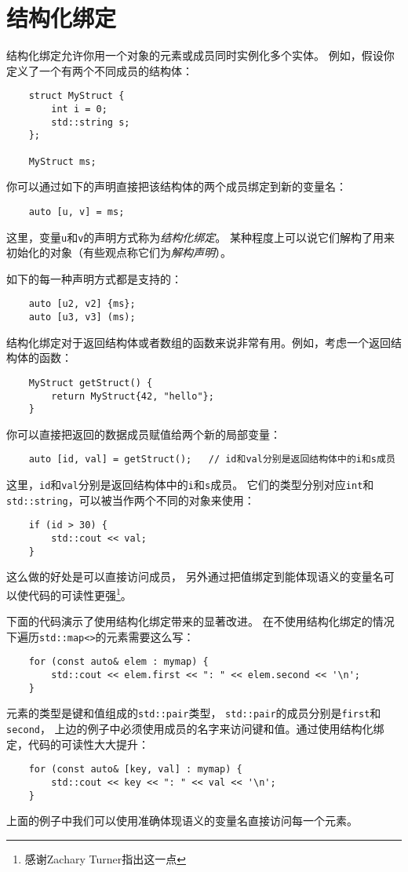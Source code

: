 \section{结构化绑定}\label{ch1}
结构化绑定允许你用一个对象的元素或成员同时实例化多个实体。
例如，假设你定义了一个有两个不同成员的结构体：
\begin{lstlisting}
    struct MyStruct {
        int i = 0;
        std::string s;
    };

    MyStruct ms;
\end{lstlisting}
你可以通过如下的声明直接把该结构体的两个成员绑定到新的变量名：
\begin{lstlisting}
    auto [u, v] = ms;
\end{lstlisting}
这里，变量\texttt{u}和\texttt{v}的声明方式称为\emph{结构化绑定}。
某种程度上可以说它们解构了用来初始化的对象（有些观点称它们为\emph{解构声明}）。

如下的每一种声明方式都是支持的：
\begin{lstlisting}
    auto [u2, v2] {ms};
    auto [u3, v3] (ms);
\end{lstlisting}
结构化绑定对于返回结构体或者数组的函数来说非常有用。例如，考虑一个返回结构体的函数：
\begin{lstlisting}
    MyStruct getStruct() {
        return MyStruct{42, "hello"};
    }
\end{lstlisting}
你可以直接把返回的数据成员赋值给两个新的局部变量：
\begin{lstlisting}
    auto [id, val] = getStruct();   // id和val分别是返回结构体中的i和s成员
\end{lstlisting}
这里，\texttt{id}和\texttt{val}分别是返回结构体中的\texttt{i}和\texttt{s}成员。
它们的类型分别对应\texttt{int}和\texttt{std::string}，可以被当作两个不同的对象来使用：
\begin{lstlisting}
    if (id > 30) {
        std::cout << val;
    }
\end{lstlisting}
这么做的好处是可以直接访问成员，
另外通过把值绑定到能体现语义的变量名可以使代码的可读性更强\footnote{感谢Zachary Turner指出这一点}。

下面的代码演示了使用结构化绑定带来的显著改进。
在不使用结构化绑定的情况下遍历\texttt{std::map<>}的元素需要这么写：
\begin{lstlisting}
    for (const auto& elem : mymap) {
        std::cout << elem.first << ": " << elem.second << '\n';
    }
\end{lstlisting}
元素的类型是键和值组成的\texttt{std::pair}类型，
\texttt{std::pair}的成员分别是\texttt{first}和\texttt{second}，
上边的例子中必须使用成员的名字来访问键和值。通过使用结构化绑定，代码的可读性大大提升：
\begin{lstlisting}
    for (const auto& [key, val] : mymap) {
        std::cout << key << ": " << val << '\n';
    }
\end{lstlisting}
上面的例子中我们可以使用准确体现语义的变量名直接访问每一个元素。

